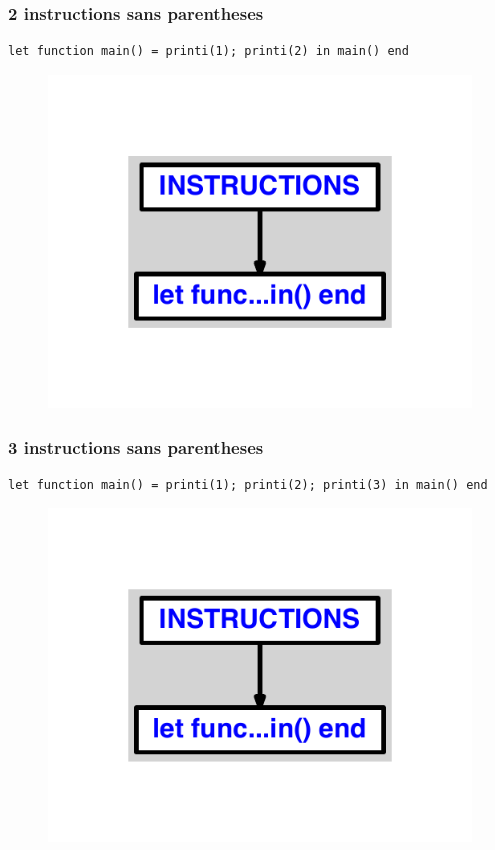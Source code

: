 \documentclass{article}
\begin{document}
\subsubsection{2 instructions sans parentheses}
\begin{lstlisting}
let function main() = printi(1); printi(2) in main() end
\end{lstlisting}
\newpage
\begin{figure}[H]
\centering
\includegraphics[max width=\textwidth]{ast/ast_139.pdf}
\end{figure}
\newpage
\subsubsection{3 instructions sans parentheses}
\begin{lstlisting}
let function main() = printi(1); printi(2); printi(3) in main() end
\end{lstlisting}
\newpage
\begin{figure}[H]
\centering
\includegraphics[max width=\textwidth]{ast/ast_140.pdf}
\end{figure}
\newpage
\end{document}
